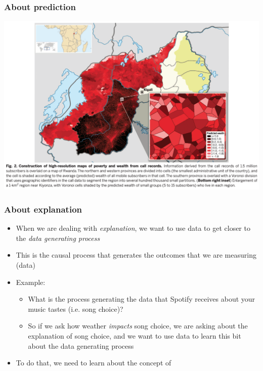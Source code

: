 \documentclass[aspectratio=43]{beamer}
\begin{document}
\begin{frame}
\frametitle{About prediction}
\centering

\includegraphics[width = \textwidth]{../img/blumenstock3}

\end{frame}

\begin{frame}
\frametitle{About explanation}
\centering

\begin{itemize}
  \item When we are dealing with \textit{explanation}, we want to use data to get closer to the \textit{data generating process}
  \item This is the causal process that generates the outcomes that we are measuring (data)
  \item<2-> Example:
  \begin{itemize}
    \item What is the process generating the data that Spotify receives about your music tastes (i.e. song choice)?
    \item<3-> So if we ask how weather \textit{impacts} song choice, we are asking about the explanation of song choice, and we want to use data to learn this bit about the data generating process
  \end{itemize}
  \item To do that, we need to learn about the concept of 
\end{itemize}

\end{frame}
\end{document}
